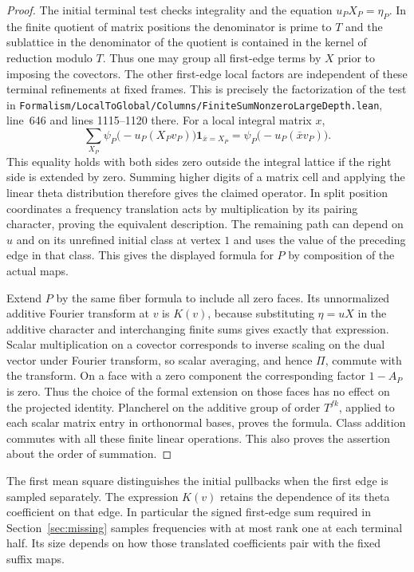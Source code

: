 \documentclass[a4paper,11pt]{article}
\theoremstyle{definition}
\theoremstyle{remark}
\newcommand{\srcloc}[2]{{\small\nolinkurl{#1.lean}}, line~#2}
\numberwithin{equation}{section}
\begin{document}
\begin{proof}
The initial terminal test checks integrality and the equation
\(u_P X_P=\eta_P\). In the finite quotient of matrix positions
the denominator is prime to \(T\) and the sublattice in the
denominator of the quotient is contained in the kernel of
reduction modulo \(T\). Thus one may group all first-edge
terms by \(X\) prior to imposing the covectors. The other
first-edge local factors are independent of these terminal
refinements at fixed frames. This is precisely the factorization
of the test in
\srcloc{Formalism/LocalToGlobal/Columns/FiniteSumNonzeroLargeDepth}{646}
and lines 1115--1120 there. For a local integral matrix
\(x\),
\[
 \sum_{X_P}\psi_P\big(-u_P(X_Pv_P)\big)
                       \mathbf1_{\bar x=X_P}
                   =\psi_P\big(-u_P(\bar x v_P)\big).
\]
This equality holds with both sides zero outside the integral
lattice if the right side is extended by zero. Summing higher
digits of a matrix cell and applying the linear theta
distribution therefore gives the claimed operator. In split
position coordinates a frequency translation acts by multiplication
by its pairing character, proving the equivalent description.
The remaining path can depend on \(u\) and on its unrefined
initial class at vertex \(1\) and uses the value of the preceding
edge in that class. This gives the displayed formula for \(P\)
by composition of the actual maps.

Extend \(P\) by the same fiber formula to include all zero
faces. Its unnormalized additive Fourier transform at \(v\)
is \(K(v)\), because substituting \(\eta=uX\) in the additive
character and interchanging finite sums gives exactly that
expression. Scalar multiplication on a covector corresponds
to inverse scaling on the dual vector under Fourier transform,
so scalar averaging, and hence \(\Pi\), commute with the
transform. On a face with a zero component the corresponding
factor \(1-A_P\) is zero. Thus the choice of the formal
extension on those faces has no effect on the projected identity.
Plancherel on the additive group of order \(T^{fk}\), applied
to each scalar matrix entry in orthonormal bases, proves the
formula. Class addition commutes with all these finite linear
operations. This also proves the assertion about the order
of summation.
\end{proof}

The first mean square distinguishes the initial pullbacks when
the first edge is sampled separately. The expression \(K(v)\)
retains the dependence of its theta coefficient on that edge.
In particular the signed first-edge sum required in
Section~\ref{sec:missing} samples frequencies with at most rank
one at each terminal half. Its size depends on how those
translated coefficients pair with the fixed suffix maps.
\end{document}

